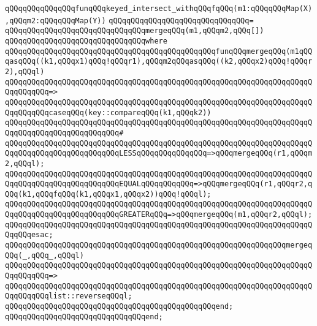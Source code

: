 \verb|qQQqqQQqqQQqqQQqfunqQQqkeyed_intersect_withqQQqfqQQq(m1:qQQqqQQqMap(X),qQQqm2:qQQqqQQqMap(Y))|\newline
\verb|qQQqqQQqqQQqqQQqqQQqqQQqqQQqqQQq=|\newline
\verb|qQQqqQQqqQQqqQQqqQQqqQQqqQQqqQQqmergeqQQq(m1,qQQqm2,qQQq[])|\newline
\verb|qQQqqQQqqQQqqQQqqQQqqQQqqQQqqQQqwhere|\newline
\verb|qQQqqQQqqQQqqQQqqQQqqQQqqQQqqQQqqQQqqQQqqQQqqQQqfunqQQqmergeqQQq(m1qQQqasqQQq((k1,qQQqx1)qQQq!qQQqr1),qQQqm2qQQqasqQQq((k2,qQQqx2)qQQq!qQQqr2),qQQql)|\newline
\verb|qQQqqQQqqQQqqQQqqQQqqQQqqQQqqQQqqQQqqQQqqQQqqQQqqQQqqQQqqQQqqQQqqQQqqQQqqQQqqQQq=>|\newline
\verb|qQQqqQQqqQQqqQQqqQQqqQQqqQQqqQQqqQQqqQQqqQQqqQQqqQQqqQQqqQQqqQQqqQQqqQQqqQQqqQQqcaseqQQq(key::compareqQQq(k1,qQQqk2))|\newline
\verb|qQQqqQQqqQQqqQQqqQQqqQQqqQQqqQQqqQQqqQQqqQQqqQQqqQQqqQQqqQQqqQQqqQQqqQQqqQQqqQQqqQQqqQQqqQQqqQQq#|\newline
\verb|qQQqqQQqqQQqqQQqqQQqqQQqqQQqqQQqqQQqqQQqqQQqqQQqqQQqqQQqqQQqqQQqqQQqqQQqqQQqqQQqqQQqqQQqqQQqqQQqLESSqQQqqQQqqQQqqQQq=>qQQqmergeqQQq(r1,qQQqm2,qQQql);|\newline
\verb|qQQqqQQqqQQqqQQqqQQqqQQqqQQqqQQqqQQqqQQqqQQqqQQqqQQqqQQqqQQqqQQqqQQqqQQqqQQqqQQqqQQqqQQqqQQqqQQqEQUALqQQqqQQqqQQq=>qQQqmergeqQQq(r1,qQQqr2,qQQq(k1,qQQqfqQQq(k1,qQQqx1,qQQqx2))qQQq!qQQql);|\newline
\verb|qQQqqQQqqQQqqQQqqQQqqQQqqQQqqQQqqQQqqQQqqQQqqQQqqQQqqQQqqQQqqQQqqQQqqQQqqQQqqQQqqQQqqQQqqQQqqQQqGREATERqQQq=>qQQqmergeqQQq(m1,qQQqr2,qQQql);|\newline
\verb|qQQqqQQqqQQqqQQqqQQqqQQqqQQqqQQqqQQqqQQqqQQqqQQqqQQqqQQqqQQqqQQqqQQqqQQqqQQqesac;|\newline
\newline
\verb|qQQqqQQqqQQqqQQqqQQqqQQqqQQqqQQqqQQqqQQqqQQqqQQqqQQqqQQqqQQqqQQqmergeqQQq(_,qQQq_,qQQql)|\newline
\verb|qQQqqQQqqQQqqQQqqQQqqQQqqQQqqQQqqQQqqQQqqQQqqQQqqQQqqQQqqQQqqQQqqQQqqQQqqQQqqQQq=>|\newline
\verb|qQQqqQQqqQQqqQQqqQQqqQQqqQQqqQQqqQQqqQQqqQQqqQQqqQQqqQQqqQQqqQQqqQQqqQQqqQQqqQQqlist::reverseqQQql;|\newline
\verb|qQQqqQQqqQQqqQQqqQQqqQQqqQQqqQQqqQQqqQQqqQQqqQQqend;|\newline
\verb|qQQqqQQqqQQqqQQqqQQqqQQqqQQqqQQqend;|\newline
\newline

